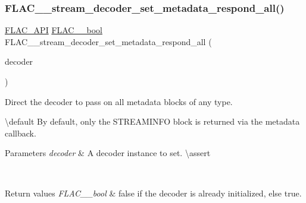 \subsubsection{\texorpdfstring{FLAC\_\_stream\_decoder\_set\_metadata\_respond\_all()}{FLAC\_\_stream\_decoder\_set\_metadata\_respond\_all()}}
{\footnotesize\ttfamily \mbox{\hyperlink{group__flac__export_ga56ca07df8a23310707732b1c0007d6f5}{F\+L\+A\+C\+\_\+\+A\+PI}} \mbox{\hyperlink{ordinals_8h_a95103469f1cbd78b8cf250194985b34e}{F\+L\+A\+C\+\_\+\+\_\+bool}} F\+L\+A\+C\+\_\+\+\_\+stream\+\_\+decoder\+\_\+set\+\_\+metadata\+\_\+respond\+\_\+all (\begin{DoxyParamCaption}\item[{\mbox{\hyperlink{struct_f_l_a_c_____stream_decoder}{F\+L\+A\+C\+\_\+\+\_\+\+Stream\+Decoder}} $\ast$}]{decoder }\end{DoxyParamCaption})}

Direct the decoder to pass on all metadata blocks of any type.

\textbackslash{}default By default, only the {\ttfamily S\+T\+R\+E\+A\+M\+I\+N\+FO} block is returned via the metadata callback. 
\begin{DoxyParams}{Parameters}
{\em decoder} & A decoder instance to set. \textbackslash{}assert 
\begin{DoxyCode}{1}
\end{DoxyCode}
 \\
\hline
\end{DoxyParams}

\begin{DoxyRetVals}{Return values}
{\em F\+L\+A\+C\+\_\+\+\_\+bool} & {\ttfamily false} if the decoder is already initialized, else {\ttfamily true}. \\
\hline
\end{DoxyRetVals}
\mbox{\label{group__flac__stream__decoder_gabf2a1e945eb2a158090665e03ff55ad2}} 
